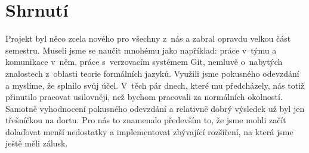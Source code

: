 \documentclass[a4paper,11pt,leqno]{article}
\begin{document}
\section{Shrnutí}
Projekt byl něco zcela nového pro všechny z~nás a zabral opravdu velkou část semestru.
Museli jsme se naučit mnohému jako například: práce v~týmu a komunikace v~něm,
práce s~verzovacím systémem Git, nemluvě o~nabytých znalostech z~oblasti teorie
formálních jazyků. Využili jsme pokusného odevzdání a myslíme, že splnilo
svůj účel. V~těch pár dnech, které mu předcházely, nás totiž přinutilo pracovat
usilovněji, než bychom pracovali za normálních okolností. Samotně vyhodnocení pokusného odevzdání
a relativně dobrý výsledek už byl jen třešníčkou na dortu. Pro nás to znamenalo 
především to, že jsme mohli začít dolaďovat menší nedostatky a implementovat
zbývající rozšíření, na která jsme ještě měli zálusk.
\end{document}
